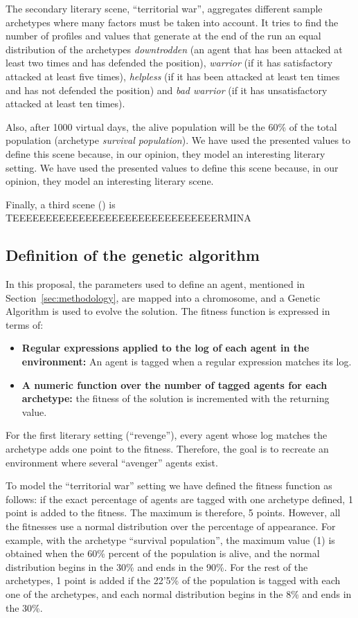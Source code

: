 \documentclass[letterpaper]{article}
\begin{document}
The secondary literary scene, ``territorial war'', aggregates different sample archetypes where many factors must be taken into account.  It tries to find the number of profiles and values that generate at the end of the run an equal distribution of the archetypes \textit{downtrodden} (an agent that has been attacked at least two times and has defended the position), \textit{warrior} (if it has satisfactory attacked at least five times), \textit{helpless} (if it has been attacked at least ten times and has not defended the position) and \textit{bad warrior} (if it has unsatisfactory attacked at least ten times).

 Also,  after 1000 virtual days, the alive population will be the 60\% of the total population (archetype \textit{survival population}). We have used the presented values to define this scene because, in our opinion, they model an interesting literary setting. We have used the presented values to define this scene because, in our opinion, they model an interesting literary scene.

Finally, a third scene () is TEEEEEEEEEEEEEEEEEEEEEEEEEEEEEEERMINA




\subsection{Definition of  the genetic algorithm}

In this proposal, the parameters used to define an agent, mentioned in Section~\ref{sec:methodology}, are mapped into a chromosome, and a Genetic Algorithm is used to evolve the solution. The fitness function is expressed in terms of:

\begin{itemize}
\item \textbf{Regular expressions applied to the log of each agent in the environment:} An agent is tagged when a regular expression matches its log.
\item \textbf{A numeric function over the number of tagged agents for each archetype:} the fitness of the solution is incremented with the returning value.
\end{itemize}

For the first literary setting (``revenge''), every agent whose log matches the archetype adds one point to the fitness. Therefore, the goal is to recreate an environment where several ``avenger'' agents exist.

To model the ``territorial war'' setting we have defined the fitness function as follows: if the exact percentage of agents are tagged with one archetype defined, 1 point is added to the fitness. The maximum is therefore, 5 points. However, all the fitnesses use a normal distribution over the percentage of appearance. For example, with the archetype ``survival population'', the maximum value (1) is obtained when the 60\% percent of the population is alive, and the normal distribution begins in the 30\% and ends in the 90\%. For the rest of the archetypes, 1 point is added if the 22'5\% of the population is tagged with each one of the archetypes, and each normal distribution begins in the 8\% and ends in the 30\%.
\end{document}
